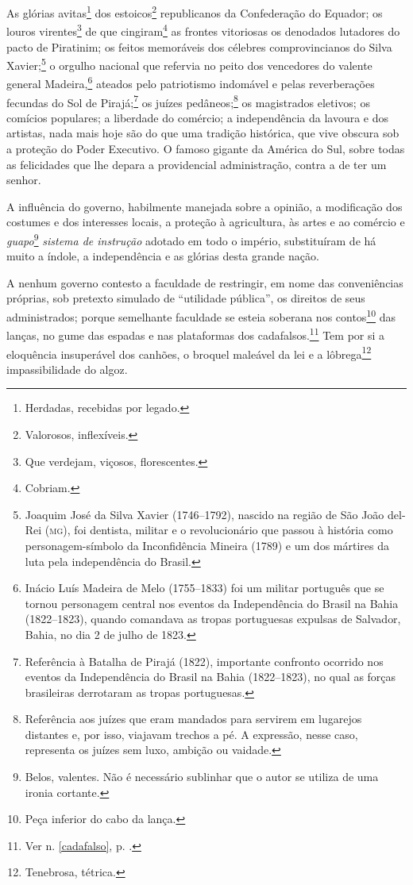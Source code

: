 As glórias avitas\footnote{Herdadas, recebidas por legado.} dos
estoicos\footnote{Valorosos, inflexíveis.} republicanos da
Confederação do Equador; os louros virentes\footnote{Que verdejam,
  viçosos, florescentes.} de que cingiram\footnote{Cobriam.} as
frontes vitoriosas os denodados lutadores do pacto de Piratinim; os
feitos memoráveis dos célebres comprovincianos do Silva
Xavier;\footnote{Joaquim José da Silva Xavier (1746--1792), nascido na
  região de São João del-Rei (\textsc{mg}), foi dentista, militar e o
  revolucionário que passou à história como personagem-símbolo da
  Inconfidência Mineira (1789) e um dos mártires da luta pela
  independência do Brasil.} o orgulho nacional que refervia no peito
dos vencedores do valente general Madeira,\footnote{Inácio Luís Madeira
  de Melo (1755--1833) foi um militar português que se tornou personagem
  central nos eventos da Independência do Brasil na Bahia (1822--1823),
  quando comandava as tropas portuguesas expulsas de Salvador, Bahia, no
  dia 2 de julho de 1823.} ateados pelo patriotismo indomável e pelas
reverberações fecundas do Sol de Pirajá;\footnote{Referência à Batalha de Pirajá 
(1822), importante confronto ocorrido nos eventos da
  Independência do Brasil na Bahia (1822--1823), no qual as forças
  brasileiras derrotaram as tropas portuguesas.} os juízes
pedâneos;\footnote{Referência aos juízes que eram mandados para
  servirem em lugarejos distantes e, por isso, viajavam trechos a pé. A
  expressão, nesse caso, representa os juízes sem luxo, ambição ou
  vaidade.} os magistrados eletivos; os comícios populares; a liberdade
do comércio; a independência da lavoura e dos artistas, nada mais hoje
são do que uma tradição histórica, que vive obscura sob a proteção do
Poder Executivo. O famoso gigante da América do Sul, sobre todas as
felicidades que lhe depara a providencial administração, contra a de ter
um senhor. %

A influência do governo, habilmente manejada sobre a opinião, a
modificação dos costumes e dos interesses locais, a proteção à
agricultura, às artes e ao comércio e \emph{guapo}\footnote{Belos,
  valentes. Não é necessário sublinhar que o autor se utiliza de uma
  ironia cortante.} \emph{sistema de instrução} adotado em todo o
império, substituíram de há muito a índole, a independência e as glórias
desta grande nação.

A nenhum governo contesto a faculdade de restringir, em nome das
conveniências próprias, sob pretexto simulado de ``utilidade pública'', os
direitos de seus administrados; porque semelhante faculdade se esteia
soberana nos contos\footnote{Peça inferior do cabo da lança.} das
lanças, no gume das espadas e nas plataformas dos cadafalsos.\footnote{Ver n. \ref{cadafalso}, p. \pageref{cadafalso}.} Tem por si a eloquência insuperável dos canhões, 
o broquel maleável da lei e a lôbrega\footnote{Tenebrosa, tétrica.} impassibilidade do
algoz.


